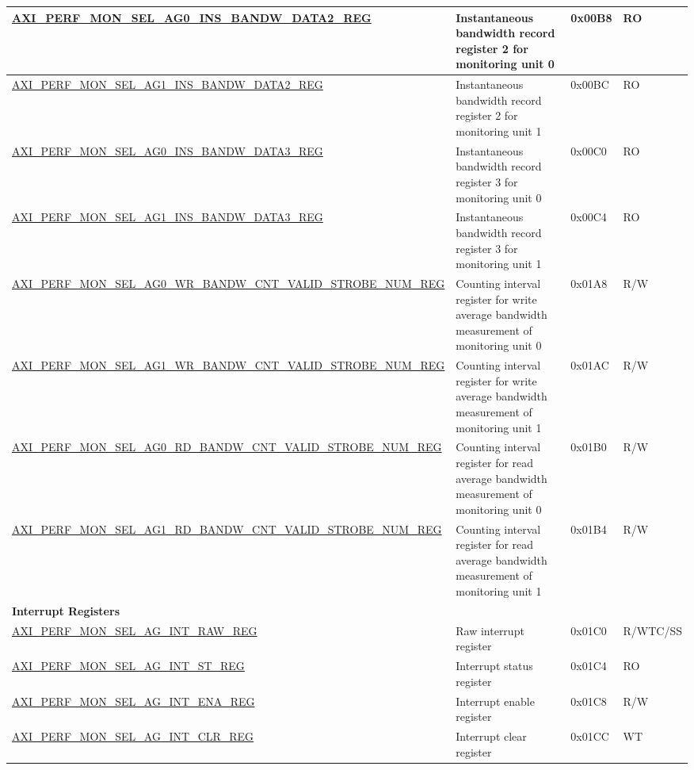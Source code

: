\begin{longtable}{ | p{9.1cm} | p{5cm} | p{1.3cm} | p{1.4cm} | }
\hyperref[regdesc:AXIPERFMONSELAGNINSBANDWDATAMREG]{AXI\_PERF\_MON\_SEL\_AG0\_INS\_BANDW\_DATA2\_REG} & Instantaneous bandwidth record register 2 for monitoring unit 0 & 0x00B8 & RO\\ \hline
\hyperref[regdesc:AXIPERFMONSELAGNINSBANDWDATAMREG]{AXI\_PERF\_MON\_SEL\_AG1\_INS\_BANDW\_DATA2\_REG} & Instantaneous bandwidth record register 2 for monitoring unit 1 & 0x00BC & RO\\ \hline
\hyperref[regdesc:AXIPERFMONSELAGNINSBANDWDATAMREG]{AXI\_PERF\_MON\_SEL\_AG0\_INS\_BANDW\_DATA3\_REG} & Instantaneous bandwidth record register 3 for monitoring unit 0 & 0x00C0 & RO\\ \hline
\hyperref[regdesc:AXIPERFMONSELAGNINSBANDWDATAMREG]{AXI\_PERF\_MON\_SEL\_AG1\_INS\_BANDW\_DATA3\_REG} & Instantaneous bandwidth record register 3 for monitoring unit 1 & 0x00C4 & RO\\ \hline
\hyperref[regdesc:AXIPERFMONSELAGNWRBANDWCNTVALIDSTROBENUMREG]{AXI\_\-PERF\_\-MON\_\-SEL\_\-AG0\_\-WR\_\-BANDW\_\-CNT\_\-VALID\_\-STROBE\_\-NUM\_\-REG} & Counting interval register for write average bandwidth measurement of monitoring unit 0
 & 0x01A8 & R/W \\ \hline
\hyperref[regdesc:AXIPERFMONSELAGNWRBANDWCNTVALIDSTROBENUMREG]{AXI\_\-PERF\_\-MON\_\-SEL\_\-AG1\_\-WR\_\-BANDW\_\-CNT\_\-VALID\_\-STROBE\_\-NUM\_\-REG} & Counting interval register for write average bandwidth measurement of monitoring unit 1 & 0x01AC & R/W \\ \hline
\hyperref[regdesc:AXIPERFMONSELAGNRDBANDWCNTVALIDSTROBENUMREG]{AXI\_\-PERF\_\-MON\_\-SEL\_\-AG0\_\-RD\_\-BANDW\_\-CNT\_\-VALID\_\-STROBE\_\-NUM\_\-REG} & Counting interval register for read average bandwidth measurement of monitoring unit 0 & 0x01B0 & R/W \\ \hline
\hyperref[regdesc:AXIPERFMONSELAGNRDBANDWCNTVALIDSTROBENUMREG]{AXI\_\-PERF\_\-MON\_\-SEL\_\-AG1\_\-RD\_\-BANDW\_\-CNT\_\-VALID\_\-STROBE\_\-NUM\_\-REG} & Counting interval register for read average bandwidth measurement of monitoring unit 1 & 0x01B4 & R/W \\ \hline
\multicolumn{4}{|l|}{\textbf{Interrupt Registers}} \\ \hline
\hyperref[regdesc:AXIPERFMONSELAGINTRAWREG]{AXI\_PERF\_MON\_SEL\_AG\_INT\_RAW\_REG} & Raw interrupt register & 0x01C0 & R/WTC/SS\\ \hline
\hyperref[regdesc:AXIPERFMONSELAGINTSTREG]{AXI\_PERF\_MON\_SEL\_AG\_INT\_ST\_REG} & Interrupt status register & 0x01C4 & RO\\ \hline
\hyperref[regdesc:AXIPERFMONSELAGINTENAREG]{AXI\_PERF\_MON\_SEL\_AG\_INT\_ENA\_REG} & Interrupt enable register & 0x01C8 & R/W\\ \hline
\hyperref[regdesc:AXIPERFMONSELAGINTCLRREG]{AXI\_PERF\_MON\_SEL\_AG\_INT\_CLR\_REG} & Interrupt clear register & 0x01CC & WT\\ \hline
\end{longtable}
